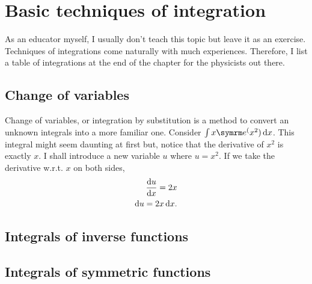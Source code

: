 \chapter{Basic techniques of integration}
\label{sec:techniquesofintegration}

\begin{abstract}
    This chapter explores various techniques you can use to integrate stuffs. You still have to keep in mind that even though this chapter is very abstracted away, \emph{integrals still have its geometric meaning: area under the graph.} This geometric interpretation is going to somewhat appear quite often throughout the chapter, so be aware of it.

    Also, some integrals are definite: they have clear boundaries of integrations. You also have to keep track of what variable is bounded by that bound, otherwise you might end up evaluating incorrectly.
\end{abstract}

As an educator myself, I usually don't teach this topic but leave it as an exercise. Techniques of integrations come naturally with much experiences. Therefore, I list a table of integrations at the end of the chapter for the physicists out there.

\section{Change of variables}
\label{sec:changeofvariables}

Change of variables, or integration by substitution is a method to convert an unknown integrals into a more familiar one. Consider $\int x\e^(x^2)\odif{x}$. This integral might seem daunting at first but, notice that the derivative of $x^2$ is exactly $x$. I shall introduce a new variable $u$ where $u = x^2$. If we take the derivative w.r.t. $x$ on both sides,
\begin{align*}
    \odv{u}{x} = 2x \\
    \odif{u} = 2x\odif{x}.
\end{align*}

\section{Integrals of inverse functions}

\section{Integrals of symmetric functions}

